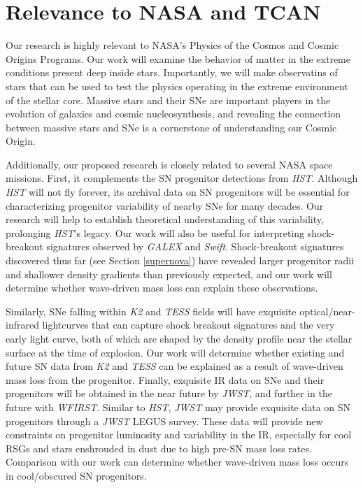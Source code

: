 {\color{orange}

\section{Relevance to NASA and TCAN}



Our research is highly relevant to NASA's Physics of the Cosmos and Cosmic Origins Programs. Our work will examine the behavior of matter in the extreme conditions present deep inside stars. Importantly, we will make observatins of stars that can be used to test the physics operating in the extreme environment of the stellar core. Massive stars and their SNe are important players in the evolution of galaxies and cosmic nucleosynthesis, and revealing the connection between massive stars and SNe is a cornerstone of understanding our Cosmic Origin.

Additionally, our proposed research is closely related to several NASA space missions. First, it complements the SN progenitor detections from {\it HST}. Although {\it HST} will not fly forever, its archival data on SN progenitors will be essential for characterizing progenitor variability of nearby SNe for many decades. Our research will help to establish theoretical understanding of this variability, prolonging {\it HST}'s legacy. Our work will also be useful for interpreting shock-breakout signatures observed by {\it GALEX} and {\it Swift}. Shock-breakout signatures discovered thus far (see Section \ref{supernova}) have revealed larger progenitor radii and shallower density gradients than previously expected, and our work will determine whether wave-driven mass loss can explain these observations.

Similarly, SNe falling within {\it K2} and {\it TESS} fields will have exquisite optical/near-infrared lightcurves that can capture shock breakout signatures and the very early light curve, both of which are shaped by the density profile near the stellar surface at the time of explosion. Our work will determine whether existing and future SN data from {\it K2} and {\it TESS} can be explained as a result of wave-driven mass loss from the progenitor. Finally, exquisite IR data on SNe and their progenitors will be obtained in the near future by {\it JWST}, and further in the future with {\it WFIRST}. Similar to {\it HST}, {\it JWST} may provide exquisite data on SN progenitors through a {\it JWST} LEGUS survey. These data will provide new constraints on progenitor luminosity and variability in the IR, especially for cool RSGs and stars enshrouded in dust due to high pre-SN mass loss rates. Comparison with our work can determine whether wave-driven mass loss occurs in cool/obscured SN progenitors.


}